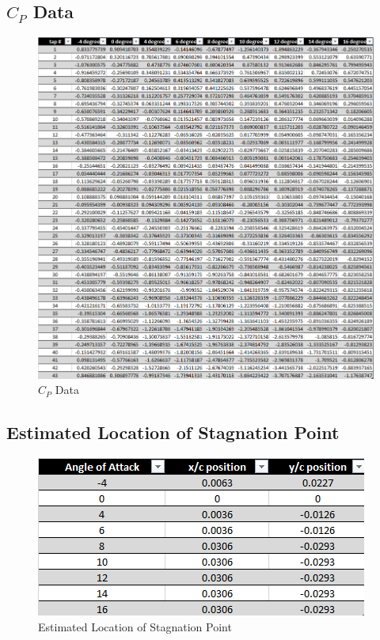 \documentclass[12pt]{article}
\begin{document}
\newpage
\subsection{\(C_P\) Data}
    \begin{figure}[h]
        \includegraphics[width=16.2 cm]{cp.png}
        \centering
        \caption{\(C_P\) Data}
    \end{figure}
\newpage

\subsection{Estimated Location of Stagnation Point}
    \begin{figure}[h]
        \includegraphics[width=10 cm]{pos.png}
        \centering
        \caption{Estimated Location of Stagnation Point}
    \end{figure}
\newpage
\end{document}
